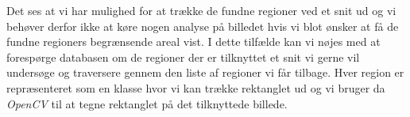 {Det ses at vi har mulighed for at trække de fundne regioner ved et
snit ud og vi behøver derfor ikke at køre nogen analyse på billedet hvis
vi blot ønsker at få de fundne regioners begrænsende areal vist. I dette
tilfælde kan vi nøjes med at forespørge databasen om de regioner der er
tilknyttet et snit vi gerne vil undersøge og traversere gennem den liste
af regioner vi får tilbage. Hver region er repræsenteret som en klasse
hvor vi kan trække rektanglet ud og vi bruger da \emph{OpenCV} til at
tegne rektanglet på det tilknyttede billede.
}
